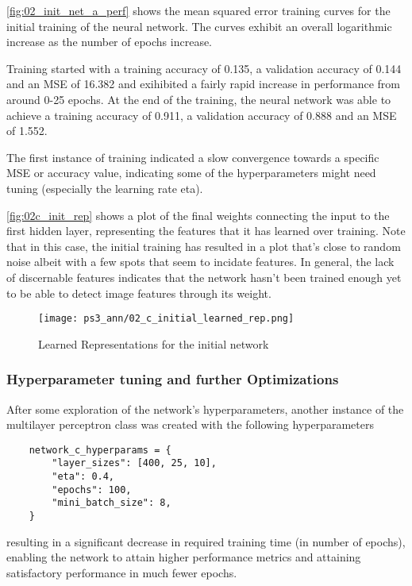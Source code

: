 \documentclass{article} %
\theoremstyle{definition}
\theoremstyle{remark}
\theoremstyle{plain}
\begin{document}
\autoref{fig:02_init_net_a_perf} shows the mean squared error training curves for the initial training of the neural network. The curves exhibit an overall logarithmic increase as the number of epochs increase.

Training started with a training accuracy of 0.135, a validation accuracy of 0.144 and an MSE of 16.382 and exihibited a fairly rapid increase in performance from around 0-25 epochs. At the end of the training, the neural network was able to achieve a training accuracy of 0.911, a validation accuracy of 0.888 and an MSE of 1.552.



The first instance of training indicated a slow convergence towards a specific MSE or accuracy value, indicating some of the hyperparameters might need tuning (especially the learning rate eta).

\autoref{fig:02c_init_rep} shows a plot of the final weights connecting the input to the first hidden layer, representing the features that it has learned over training. Note that in this case, the initial training has resulted in a plot that's close to random noise albeit with a few spots that seem to incidate features. In general, the lack of discernable features indicates that the network hasn't been trained enough yet to be able to detect image features through its weight. 

\begin{figure}[h!]
    \centering
    \texttt{[image: ps3\_ann/02\_c\_initial\_learned\_rep.png]}
    \caption{Learned Representations for the initial network}
    \label{fig:02c_init_rep}
\end{figure}

\subsubsection{Hyperparameter tuning and further Optimizations}

After some exploration of the network's hyperparameters, another instance of the multilayer perceptron class was created with the following hyperparameters

\begin{verbatim}
    network_c_hyperparams = {
        "layer_sizes": [400, 25, 10],
        "eta": 0.4,
        "epochs": 100,
        "mini_batch_size": 8,
    }
\end{verbatim}
resulting in a significant decrease in required training time (in number of epochs), enabling the network to attain higher performance metrics and attaining satisfactory performance in much fewer epochs.
\end{document}
